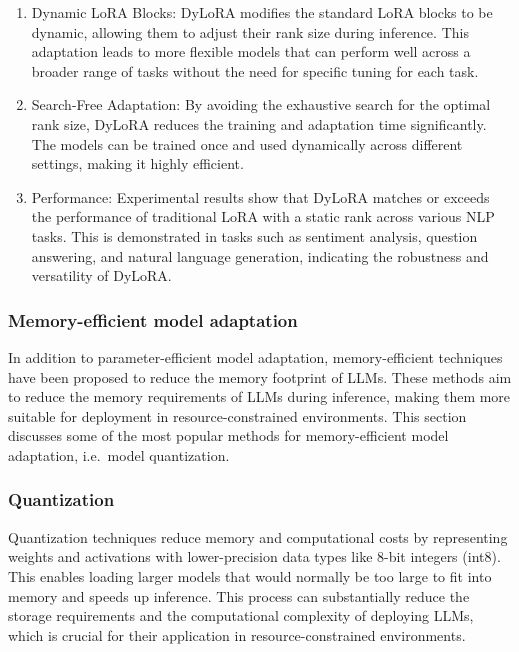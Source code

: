 \begin{enumerate}
	\item Dynamic LoRA Blocks: DyLoRA modifies the standard LoRA blocks to be dynamic, allowing them to adjust their rank size during inference. This adaptation leads to more flexible models that can perform well across a broader range of tasks without the need for specific tuning for each task.

	\item Search-Free Adaptation: By avoiding the exhaustive search for the optimal rank size, DyLoRA reduces the training and adaptation time significantly. The models can be trained once and used dynamically across different settings, making it highly efficient.

	\item Performance: Experimental results show that DyLoRA matches or exceeds the performance of traditional LoRA with a static rank across various NLP tasks. This is demonstrated in tasks such as sentiment analysis, question answering, and natural language generation, indicating the robustness and versatility of DyLoRA.

\end{enumerate}

\subsubsection{Memory-efficient model adaptation}
\label{subsubsec:memory-efficient}

In addition to parameter-efficient model adaptation, memory-efficient techniques have been proposed to reduce the memory footprint of LLMs.
These methods aim to reduce the memory requirements of LLMs during inference, making them more suitable for deployment in resource-constrained environments.
This section discusses some of the most popular methods for memory-efficient model adaptation, i.e.\ model quantization.

\subsubsection{Quantization}
\label{subsubsec:quantization}

Quantization techniques reduce memory and computational costs by representing weights and activations with lower-precision data types like 8-bit integers (int8).
This enables loading larger models that would normally be too large to fit into memory and speeds up inference.
This process can substantially reduce the storage requirements and the computational complexity of deploying LLMs, which is crucial for their application in resource-constrained environments.

